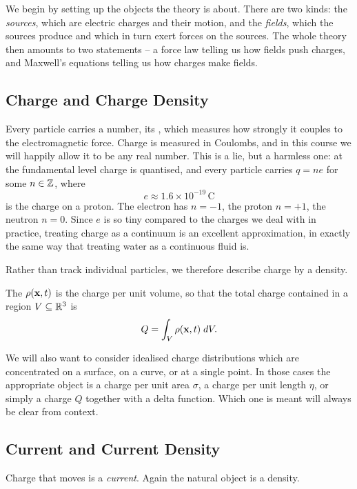 \documentclass[a4paper]{scrartcl}
\begin{document}
We begin by setting up the objects the theory is about. There are two kinds: the \emph{sources}, which are electric charges and their motion, and the \emph{fields}, which the sources produce and which in turn exert forces on the sources. The whole theory then amounts to two statements -- a force law telling us how fields push charges, and Maxwell's equations telling us how charges make fields.

\subsection{Charge and Charge Density}

Every particle carries a number, its , which measures how strongly it couples to the electromagnetic force. Charge is measured in Coulombs, and in this course we will happily allow it to be any real number. This is a lie, but a harmless one: at the fundamental level charge is quantised, and every particle carries $q = ne$ for some $n \in \mathbb{Z}$, where
$$
e \approx 1.6 \times 10^{-19}\,\mathrm{C}
$$
is the charge on a proton. The electron has $n = -1$, the proton $n = +1$, the neutron $n = 0$. Since $e$ is so tiny compared to the charges we deal with in practice, treating charge as a continuum is an excellent approximation, in exactly the same way that treating water as a continuous fluid is.

Rather than track individual particles, we therefore describe charge by a density.

\begin{definition}
	The  $\rho(\mathbf{x}, t)$ is the charge per unit volume, so that the total charge contained in a region $V \subseteq \mathbb{R}^3$ is
	$$
	Q = \int_V \rho(\mathbf{x}, t) \; d V.
	$$
\end{definition}

We will also want to consider idealised charge distributions which are concentrated on a surface, on a curve, or at a single point. In those cases the appropriate object is a charge per unit area $\sigma$, a charge per unit length $\eta$, or simply a charge $Q$ together with a delta function. Which one is meant will always be clear from context.

\subsection{Current and Current Density}

Charge that moves is a \emph{current}. Again the natural object is a density.
\end{document}
